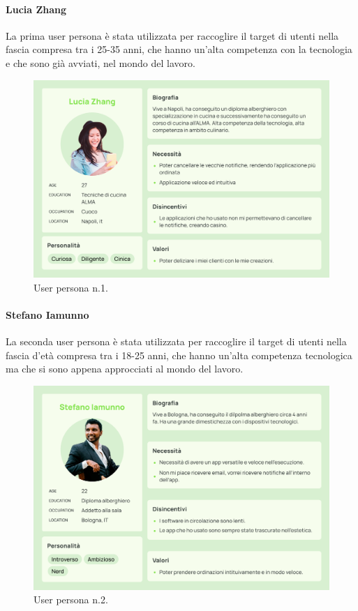 \paragraph{Lucia Zhang}
La prima user persona è stata utilizzata per raccoglire il target di utenti nella fascia compresa tra i 25-35 anni, che hanno un'alta competenza con la tecnologia e che sono già avviati, nel mondo del lavoro.
\renewcommand{\figurename}{}
\renewcommand{\thefigure}{Fig.\arabic{figure}}
\begin{figure}[H]
  \centering
  \includegraphics[scale=0.25]{img/personas/Lucia_zhang_persona.png}
  \caption{User persona n.1.}
\end{figure}

\newpage
\paragraph{Stefano Iamunno}
La seconda user persona è stata utilizzata per raccoglire il target di utenti nella fascia d'età compresa tra i 18-25 anni, che hanno un'alta competenza tecnologica ma che si sono appena approcciati al mondo del lavoro.
\begin{figure}[H]
  \centering
  \includegraphics[scale=0.25]{img/personas/Stefano_iamunno_persona.png}
  \caption{User persona n.2.}
\end{figure}
\newpage
